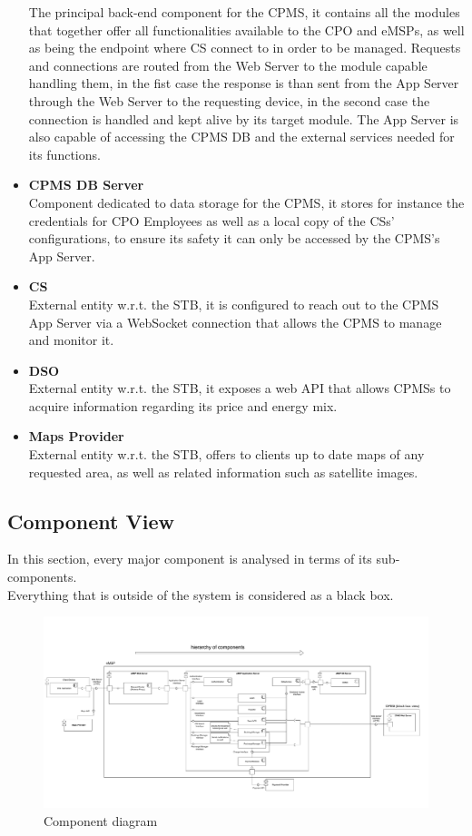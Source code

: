\documentclass[11pt]{article}
\begin{document}
\begin{itemize}
        The principal back-end component for the CPMS, it contains all the modules that together offer all functionalities available to the CPO and eMSPs, as well as being the endpoint where CS connect to in order to be managed. Requests and connections are routed from the Web Server to the module capable handling them, in the fist case the response is than sent from the App Server through the Web Server to the requesting device, in the second case the connection is handled and kept alive by its target module. The App Server is also capable of accessing the CPMS DB and the external services needed for its functions.
    \item \textbf{CPMS DB Server} \\
        Component dedicated to data storage for the CPMS, it stores for instance the credentials for CPO Employees as well as a local copy of the CSs' configurations, to ensure its safety it can only be accessed by the CPMS's App Server.
    \item \textbf{CS} \\
        External entity w.r.t. the STB, it is configured to reach out to the CPMS App Server via a WebSocket connection that allows the CPMS to manage and monitor it.
    \item \textbf{DSO} \\
        External entity w.r.t. the STB, it exposes a web API that allows CPMSs to acquire information regarding its price and energy mix.
    \item \textbf{Maps Provider} \\
        External entity w.r.t. the STB, offers to clients up to date maps of any requested area, as well as related information such as satellite images.
\end{itemize}

\subsection{Component View}

In this section, every major component is analysed in terms of its sub-components. \\
Everything that is outside of the system is considered as a black box.

\newpage

\begin{figure}[!ht]
    \centerline{
        \includegraphics[page={1}, width=1.26\linewidth, trim=0cm 2cm 0cm 4cm, angle=-90, clip]{ComponentDiagram.pdf}
    }
    \caption{Component diagram}
\end{figure}
\end{document}
